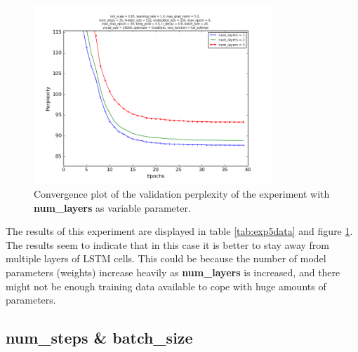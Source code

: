 \documentclass[10pt,a4paper,titlepage]{article}
\begin{document}
\begin{figure}[H]
	\begin{center}
		\includegraphics[width=0.80\textwidth]{Figures/numlayersperf.png}
		\caption{Convergence plot of the validation perplexity of the experiment with \textbf{num\_layers} as variable parameter. }
		\label{fig:exp5perf}
	\end{center}	
\end{figure}

The results of this experiment are displayed in table \ref{tab:exp5data} and figure \ref{fig:exp5perf}. The results seem to indicate that in this case it is better to stay away from multiple layers of LSTM cells. This could be because the number of model parameters (weights) increase heavily as \textbf{num\_layers} is increased, and there might not be enough training data available to cope with huge amounts of parameters.

\newpage

\subsection{num\_steps \& batch\_size}
\end{document}
